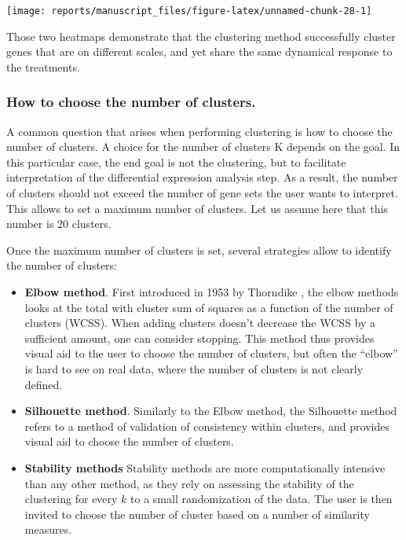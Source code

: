 \documentclass[9pt,a4paper,]{extarticle}
\begin{document}
\begin{center}\texttt{[image: reports/manuscript\_files/figure-latex/unnamed-chunk-28-1]} \end{center}

Those two heatmaps demonstrate that the clustering method successfully cluster
genes that are on different scales, and yet share the same dynamical response
to the treatments.

\hypertarget{how-to-choose-the-number-of-clusters.}{%
\subsubsection{How to choose the number of clusters.}\label{how-to-choose-the-number-of-clusters.}}

A common question that arises when performing clustering is how to choose the
number of clusters. A choice for the number of clusters K depends on the goal.
In this particular case, the end goal is not the clustering, but to facilitate
interpretation of the differential expression analysis step. As a result, the
number of clusters should not exceed the number of gene sets the user wants to
interpret. This allows to set a maximum number of clusters. Let us assume here
that this number is 20 clusters.

Once the maximum number of clusters is set, several strategies allow to
identify the number of clusters:

\begin{itemize}
\tightlist
\item
  \textbf{Elbow method}. First introduced in 1953 by Thorndike \citep{thorndike:who},
  the elbow methods looks at the total with cluster sum of squares
  as a function of the number of clusters (WCSS). When adding clusters
  doesn't decrease the WCSS by a sufficient
  amount, one can consider stopping. This method thus provides visual aid to
  the user to choose the number of clusters, but often the ``elbow'' is hard to
  see on real data, where the number of clusters is not clearly defined.
\item
  \textbf{Silhouette method}. Similarly to the Elbow method, the Silhouette method
  refers to a method of validation of consistency within clusters, and
  provides visual aid to choose the number of clusters.
\item
  \textbf{Stability methods} Stability methods are more computationally intensive
  than any other method, as they rely on assessing the stability of the
  clustering for every \(k\) to a small randomization of the data. The user is
  then invited to choose the number of cluster based on a number of similarity
  measures.
\end{itemize}
\end{document}

